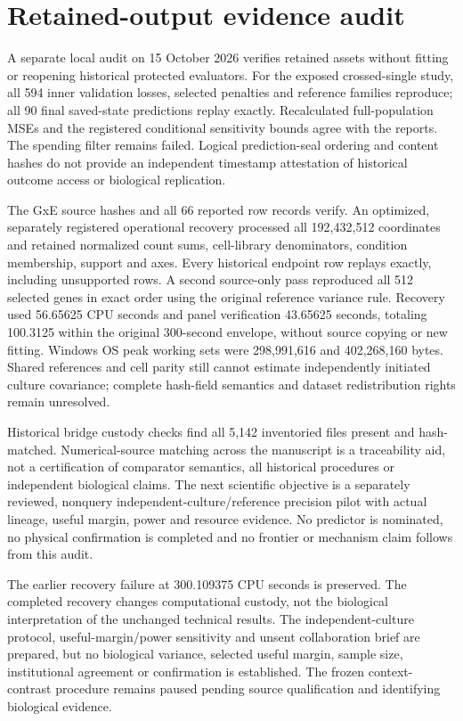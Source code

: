 \section{Retained-output evidence audit}
A separate local audit on 15 October 2026 verifies retained assets without fitting or reopening historical protected evaluators. For the exposed crossed-single study, all 594 inner validation losses, selected penalties and reference families reproduce; all 90 final saved-state predictions replay exactly. Recalculated full-population MSEs and the registered conditional sensitivity bounds agree with the reports. The spending filter remains failed. Logical prediction-seal ordering and content hashes do not provide an independent timestamp attestation of historical outcome access or biological replication.

The GxE source hashes and all 66 reported row records verify. An optimized, separately registered operational recovery processed all 192,432,512 coordinates and retained normalized count sums, cell-library denominators, condition membership, support and axes. Every historical endpoint row replays exactly, including unsupported rows. A second source-only pass reproduced all 512 selected genes in exact order using the original reference variance rule. Recovery used 56.65625 CPU seconds and panel verification 43.65625 seconds, totaling 100.3125 within the original 300-second envelope, without source copying or new fitting. Windows OS peak working sets were 298,991,616 and 402,268,160 bytes. Shared references and cell parity still cannot estimate independently initiated culture covariance; complete hash-field semantics and dataset redistribution rights remain unresolved.

Historical bridge custody checks find all 5,142 inventoried files present and hash-matched. Numerical-source matching across the manuscript is a traceability aid, not a certification of comparator semantics, all historical procedures or independent biological claims. The next scientific objective is a separately reviewed, nonquery independent-culture/reference precision pilot with actual lineage, useful margin, power and resource evidence. No predictor is nominated, no physical confirmation is completed and no frontier or mechanism claim follows from this audit.

The earlier recovery failure at 300.109375 CPU seconds is preserved. The completed recovery changes computational custody, not the biological interpretation of the unchanged technical results. The independent-culture protocol, useful-margin/power sensitivity and unsent collaboration brief are prepared, but no biological variance, selected useful margin, sample size, institutional agreement or confirmation is established. The frozen context-contrast procedure remains paused pending source qualification and identifying biological evidence.
